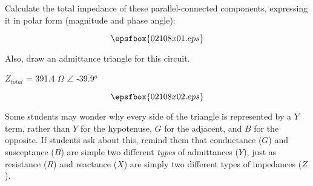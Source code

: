

Calculate the total impedance of these parallel-connected components, expressing it in polar form (magnitude and phase angle):

$$\epsfbox{02108x01.eps}$$

Also, draw an admittance triangle for this circuit.







$Z_{total}$ = 391.4 $\Omega$ $\angle$ -39.9$^{o}$

$$\epsfbox{02108x02.eps}$$







Some students may wonder why every side of the triangle is represented by a $Y$ term, rather than $Y$ for the hypotenuse, $G$ for the adjacent, and $B$ for the opposite.  If students ask about this, remind them that conductance ($G$) and susceptance ($B$) are simple two different {\it types} of admittances ($Y$), just as resistance ($R$) and reactance ($X$) are simply two different types of impedances ($Z$).




